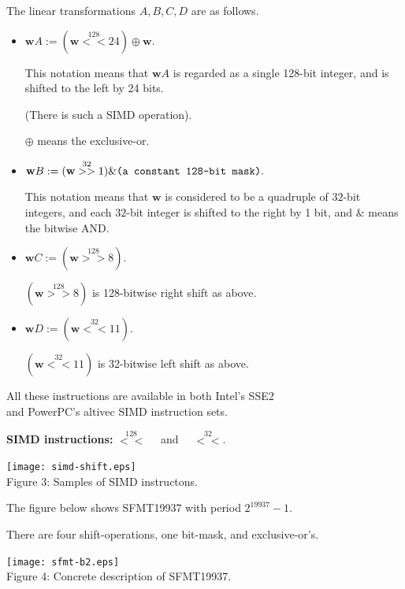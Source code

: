 \documentclass[a4j,12pt,landscape]{jarticle}
\def\bw{{{\mathbf w}}}
\begin{document}
The linear transformations $A,B,C,D$ are as follows.
\begin{itemize}
\item 
$\bw A := (\bw \stackrel{128}{<<} 24) \oplus \bw.$

This notation means that $\bw A$ is regarded
as a single 128-bit integer, and 
is shifted to the left by 24 bits.

(There is such a SIMD operation).

$\oplus$ means the exclusive-or.

\item
$\bw B := (\bw \stackrel{32}{>>} 1) \& \mbox{\tt (a constant 128-bit mask)}.$

This notation means that $\bw$ is considered to be 
a quadruple of $32$-bit integers, and
each $32$-bit integer is shifted to the right by 1 bit,
and $\&$ means the bitwise AND. 

\newpage

\item 
$\bw C := (\bw \stackrel{128}{>>} 8).$

$(\bw \stackrel{128}{>>} 8)$ is 128-bitwise right shift as above.

\item
$\bw D := (\bw \stackrel{32}{<<} 11).$

$(\bw \stackrel{32}{<<} 11)$ is 32-bitwise left shift as above.

\end{itemize}
All these instructions are available in 
both Intel's SSE2 \\
and PowerPC's altivec SIMD instruction sets.

\newpage
{\bf SIMD instructions:} 
$\stackrel{128}{<<}\quad$ and $\quad\stackrel{32}{<<}$.
\begin{center}
\texttt{[image: simd-shift.eps]}
\\
Figure 3: Samples of SIMD instructons.
\end{center}

\newpage
The figure below shows SFMT19937 with period $2^{19937}-1$.

There are four shift-operations, one bit-mask, and exclusive-or's.

\begin{center}
\texttt{[image: sfmt-b2.eps]}
\\
Figure 4: Concrete description of SFMT19937.
\end{center}
\end{document}
